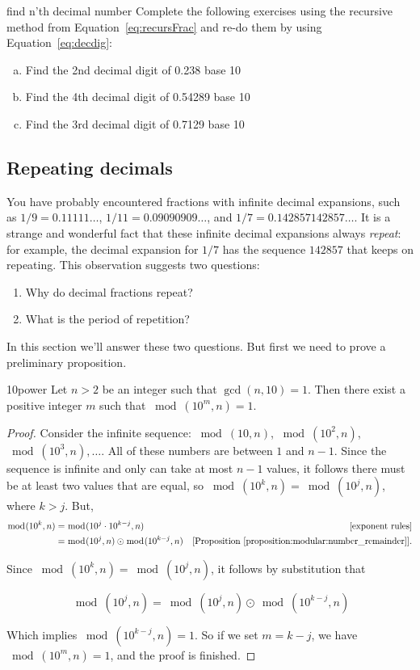 \begin{exercise} {find n'th decimal number}
Complete the following exercises using the recursive method from Equation~\eqref{eq:recursFrac} and re-do them by using Equation~\eqref{eq:decdig}:
\begin{enumerate}[(a)]
\item Find the 2nd decimal digit of 0.238 base 10
\item Find the 4th decimal digit of 0.54289 base 10
\item Find the 3rd decimal digit of 0.7129 base 10

\end{enumerate}
\end{exercise}


\subsection{Repeating decimals}
You have probably encountered  fractions with infinite decimal expansions, such as $1/9 = 0.11111\ldots$, $1/11 = 0.09090909\ldots$, and $1/7 = 0.142857142857\ldots$. It is a strange and wonderful fact that these infinite decimal expansions always \emph{repeat}: for example, the decimal expansion for $1/7$ has the sequence $142857$ that keeps on repeating. This observation suggests two questions:
\begin{enumerate}
\item Why do decimal fractions repeat?
\item What is the period of repetition?
\end{enumerate}

In this section we'll answer these two questions. But first we need to prove a preliminary proposition.

\begin{prop}{10power}
Let $n>2$ be an integer such that $\gcd(n,10)=1$. Then there exist a positive integer $m$ such that $\bmod(10^{m},n)=1$.
\end{prop}
\begin{proof}
Consider the infinite sequence: $\bmod(10,n)$, $\bmod(10^{2},n)$, $\bmod(10^{3},n),\dots$. All of these numbers are between $1$ and $n-1$. Since the sequence is infinite and only can take at most $n-1$ values, it follows there must be at least two values that are equal, so $\bmod(10^{k},n)=\bmod(10^{j},n)$, where $k>j$. But,
\begin{align*}
\bmod(10^{k},n)&=\bmod(10^{j}\cdot 10^{k-j},n) & \text{[exponent rules]}\\
&=\bmod(10^{j},n)\odot \bmod(10^{k-j},n) &\text{[Proposition~\ref{proposition:modular:number_remainder}]}.
\end{align*}

Since $\bmod(10^{k},n)=\bmod(10^{j},n)$, it follows by substitution that

\begin{equation*}
\bmod(10^{j},n)=\bmod(10^j,n)\odot \bmod(10^{k-j},n)
\end{equation*}

Which implies $\bmod(10^{k-j},n)=1$.
So if we set $m=k-j$, we have $\bmod(10^{m},n)=1$, and the proof is finished.
\end{proof}

